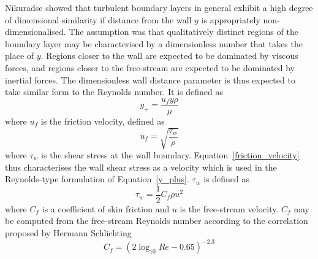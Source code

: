 \documentclass[a4paper, 11pt, oneside]{report}
\begin{document}
Nikuradse showed that turbulent boundary layers in general exhibit a high degree of dimensional similarity if distance from the wall $y$ is appropriately non-dimensionalised. The assumption was that qualitatively distinct regions of the boundary layer may be characterised by a dimensionless number that takes the place of $y$. Regions closer to the wall are expected to be dominated by viscous forces, and regions closer to the free-stream are expected to be dominated by inertial forces. The dimensionless wall distance parameter is thus expected to take similar form to the Reynolds number. It is defined as
\begin{equation}\label{y_plus}
y_+ =
\frac{u_f y \rho}{\mu} 
\end{equation}
where $u_f$ is the friction velocity, defined as
\begin{equation}\label{friction_velocity}
u_f = 
\sqrt{
	\frac{\tau_w}{\rho}
}
\end{equation}
where $\tau_w$ is the shear stress at the wall boundary. Equation~\ref{friction_velocity} thus characterises the wall shear stress as a velocity which is used in the Reynolds-type formulation of Equation~\ref{y_plus}. $\tau_w$ is defined as
\begin{equation}\label{wall_shear_stress_definition}
\tau_w =
\frac{1}{2}
C_f
\rho
u^2
\end{equation}
where $C_f$ is a coefficient of skin friction and $u$ is the free-stream velocity. $C_f$ may be computed from the free-stream Reynolds number according to the correlation proposed by Hermann Schlichting~\cite{schlichting_boundary_layer_theory}
\begin{equation}
C_f =
\left(
	2
	\log_{10}
	Re
	-
	0.65
\right)^{-2.3}
\end{equation}
\end{document}

